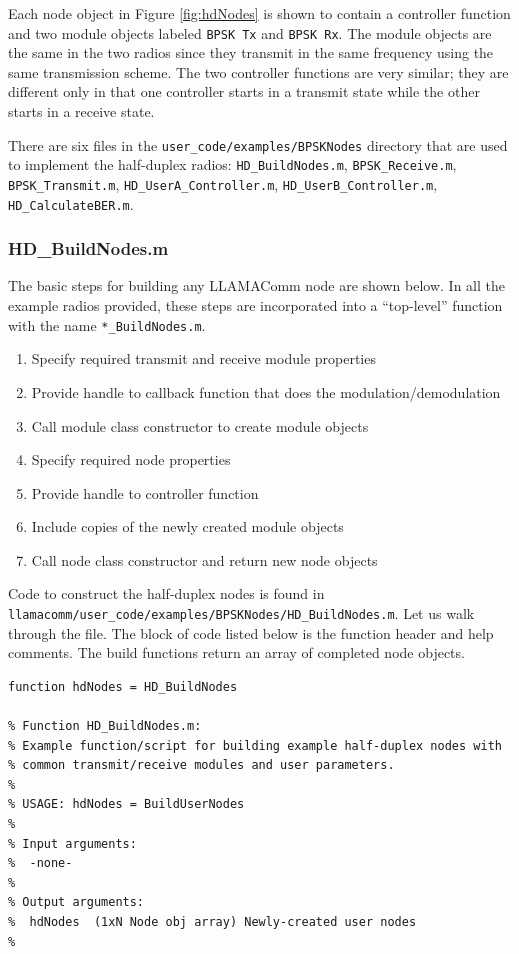 Each node object in Figure \ref{fig:hdNodes} is shown to contain a
controller function and two module objects labeled \verb+BPSK Tx+
and \verb+BPSK Rx+.  The module objects are the same in the two
radios since they transmit in the same frequency using the same
transmission scheme. The two controller functions are very similar;
they are different only in that one controller starts in a transmit
state while the other starts in a receive state.

There are six files in the \verb+user_code/examples/BPSKNodes+ directory
that are
used to implement the half-duplex radios: \verb+HD_BuildNodes.m+,
\verb+BPSK_Receive.m+, \verb+BPSK_Transmit.m+,
\verb+HD_UserA_Controller.m+, \verb+HD_UserB_Controller.m+,
\verb+HD_CalculateBER.m+.

\subsubsection{HD\_BuildNodes.m}

The basic steps for building any LLAMAComm node are shown below.  In
all the example radios provided, these steps are incorporated into a
``top-level'' function with the name \verb+*_BuildNodes.m+.

\begin{enumerate}
\item Specify required transmit and receive module properties
\item Provide handle to callback function that does the modulation/demodulation
\item Call module class constructor to create module objects
\item Specify required node properties
\item Provide handle to controller function
\item Include copies of the newly created module objects
\item Call node class constructor and return new node objects
\end{enumerate}

Code to construct the half-duplex nodes is found in
\verb+llamacomm/user_code/examples/BPSKNodes/HD_BuildNodes.m+.
Let us walk through
the file.  The block of code listed below is the function header and
help comments. The build functions return an array of completed node
objects.

\begin{lstlisting}[name=hdBuildNodes]
function hdNodes = HD_BuildNodes

% Function HD_BuildNodes.m:
% Example function/script for building example half-duplex nodes with
% common transmit/receive modules and user parameters.
%
% USAGE: hdNodes = BuildUserNodes
%
% Input arguments:
%  -none-
%
% Output arguments:
%  hdNodes  (1xN Node obj array) Newly-created user nodes
%
\end{lstlisting}

